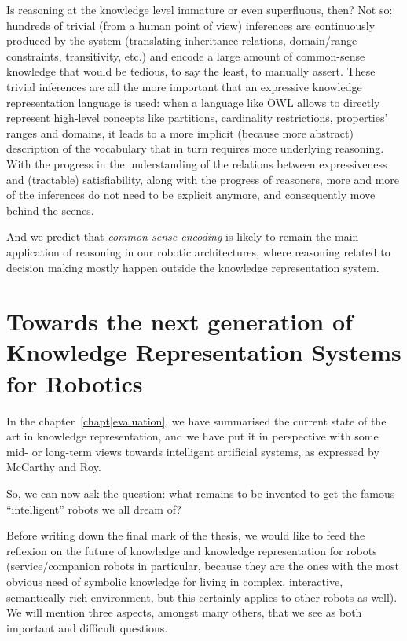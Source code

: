 Is reasoning at the knowledge level immature or even superfluous, then? Not so:
hundreds of trivial (from a human point of view) inferences are continuously
produced by the system (translating inheritance relations, domain/range
constraints, transitivity, etc.) and encode a large amount of common-sense
knowledge that would be tedious, to say the least, to manually assert. These
trivial inferences are all the more important that an expressive knowledge
representation language is used: when a language like OWL allows to directly
represent high-level concepts like partitions, cardinality restrictions,
properties' ranges and domains, it leads to a more implicit (because more
abstract) description of the vocabulary that in turn requires more underlying
reasoning. With the progress in the understanding of the relations between
expressiveness and (tractable) satisfiability, along with the progress of
reasoners, more and more of the inferences do not need to be explicit anymore,
and consequently move behind the scenes.

And we predict that \emph{common-sense encoding} is likely to remain the main
application of reasoning in our robotic architectures, where reasoning related
to decision making mostly happen outside the knowledge representation system.

\section{Towards the next generation of Knowledge Representation Systems for Robotics}
\label{sect|perspectives}

In the chapter~\ref{chapt|evaluation}, we have summarised the current state of
the art in knowledge representation, and we have put it in perspective with
some mid- or long-term views towards intelligent artificial systems, as
expressed by McCarthy and Roy.

So, we can now ask the question: what remains to be invented to get the famous
``intelligent'' robots we all dream of?

Before writing down the final mark of the thesis, we would like to feed the
reflexion on the future of knowledge and knowledge representation for robots
(service/companion robots in particular, because they are the ones with the
most obvious need of symbolic knowledge for living in complex, interactive,
semantically rich environment, but this certainly applies to other robots as
well). We will mention three aspects, amongst many others, that we see as both
important and difficult questions.

